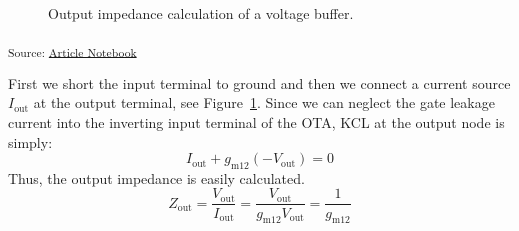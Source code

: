 \documentclass[
  a4paper,
  DIV=11,
  numbers=noendperiod]{scrartcl}
\begin{document}
\begin{figure}[H]


\caption{\label{fig-voltage-buffer-ota-noise-zout}Output impedance
calculation of a voltage buffer.}

\end{figure}%

\textsubscript{Source:
\href{https://iic-jku.github.io/analog-circuit-design/index.qmd.html}{Article
Notebook}}

\begin{tcolorbox}[enhanced jigsaw, breakable, title=\textcolor{quarto-callout-note-color}{\faInfo}\hspace{0.5em}{Output Impedence of the Voltage Buffer}, left=2mm, bottomrule=.15mm, opacitybacktitle=0.6, opacityback=0, colframe=quarto-callout-note-color-frame, leftrule=.75mm, bottomtitle=1mm, colbacktitle=quarto-callout-note-color!10!white, toprule=.15mm, rightrule=.15mm, toptitle=1mm, titlerule=0mm, arc=.35mm, colback=white, coltitle=black]

First we short the input terminal to ground and then we connect a
current source \(I_\mathrm{out}\) at the output terminal, see
Figure~\ref{fig-voltage-buffer-ota-noise-zout}. Since we can neglect the
gate leakage current into the inverting input terminal of the OTA, KCL
at the output node is simply: \[
I_\mathrm{out} + g_\mathrm{m12}\left(-V_\mathrm{out}\right) = 0
\] Thus, the output impedance is easily calculated. \[
Z_\mathrm{out} = \frac{V_\mathrm{out}}{I_\mathrm{out}} = \frac{V_\mathrm{out}}{g_\mathrm{m12}V_\mathrm{out}} = \frac{1}{g_\mathrm{m12}}
\]

\end{tcolorbox}
\end{document}
